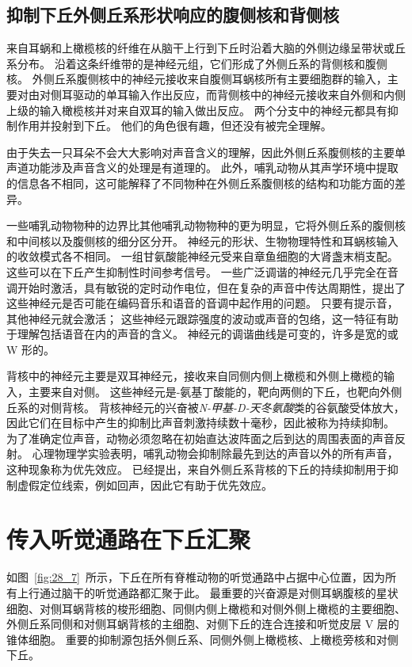 \subsection{抑制下丘外侧丘系形状响应的腹侧核和背侧核}

来自耳蜗和上橄榄核的纤维在从脑干上行到下丘时沿着大脑的外侧边缘呈带状或丘系分布。
沿着这条纤维带的是神经元组，它们形成了外侧丘系的背侧核和腹侧核。
外侧丘系腹侧核中的神经元接收来自腹侧耳蜗核所有主要细胞群的输入，主要对由对侧耳驱动的单耳输入作出反应，而背侧核中的神经元接收来自外侧和内侧上级的输入橄榄核并对来自双耳的输入做出反应。
两个分支中的神经元都具有抑制作用并投射到下丘。
他们的角色很有趣，但还没有被完全理解。


由于失去一只耳朵不会大大影响对声音含义的理解，因此外侧丘系腹侧核的主要单声道功能涉及声音含义的处理是有道理的。
此外，哺乳动物从其声学环境中提取的信息各不相同，这可能解释了不同物种在外侧丘系腹侧核的结构和功能方面的差异。


一些哺乳动物物种的边界比其他哺乳动物物种的更为明显，它将外侧丘系的腹侧核和中间核以及腹侧核的细分区分开。
神经元的形状、生物物理特性和耳蜗核输入的收敛模式各不相同。
一组甘氨酸能神经元受来自章鱼细胞的大肾盏末梢支配。 
这些可以在下丘产生抑制性时间参考信号。
一些广泛调谐的神经元几乎完全在音调开始时激活，具有敏锐的定时动作电位，但在复杂的声音中传达周期性，提出了这些神经元是否可能在编码音乐和语音的音调中起作用的问题。
只要有提示音，其他神经元就会激活； 
这些神经元跟踪强度的波动或声音的包络，这一特征有助于理解包括语音在内的声音的含义。
神经元的调谐曲线是可变的，许多是宽的或 W 形的。


背核中的神经元主要是双耳神经元，接收来自同侧内侧上橄榄和外侧上橄榄的输入，主要来自对侧。
这些神经元是\ce{$\gamma$}-氨基丁酸能的，靶向两侧的下丘，也靶向外侧丘系的对侧背核。
背核神经元的兴奋被\textit{N-甲基-D-天冬氨酸}类的谷氨酸受体放大，因此它们在目标中产生的抑制比声音刺激持续数十毫秒，因此被称为持续抑制。
为了准确定位声音，动物必须忽略在初始直达波阵面之后到达的周围表面的声音反射。
心理物理学实验表明，哺乳动物会抑制除最先到达的声音以外的所有声音，这种现象称为优先效应。
已经提出，来自外侧丘系背核的下丘的持续抑制用于抑制虚假定位线索，例如回声，因此它有助于优先效应。



\section{传入听觉通路在下丘汇聚}

如图~\ref{fig:28_7}~所示，下丘在所有脊椎动物的听觉通路中占据中心位置，因为所有上行通过脑干的听觉通路都汇聚于此。
最重要的兴奋源是对侧耳蜗腹核的星状细胞、对侧耳蜗背核的梭形细胞、同侧内侧上橄榄和对侧外侧上橄榄的主要细胞、外侧丘系同侧和对侧耳蜗背核的主细胞、对侧下丘的连合连接和听觉皮层 V 层的锥体细胞。
重要的抑制源包括外侧丘系、同侧外侧上橄榄核、上橄榄旁核和对侧下丘。


